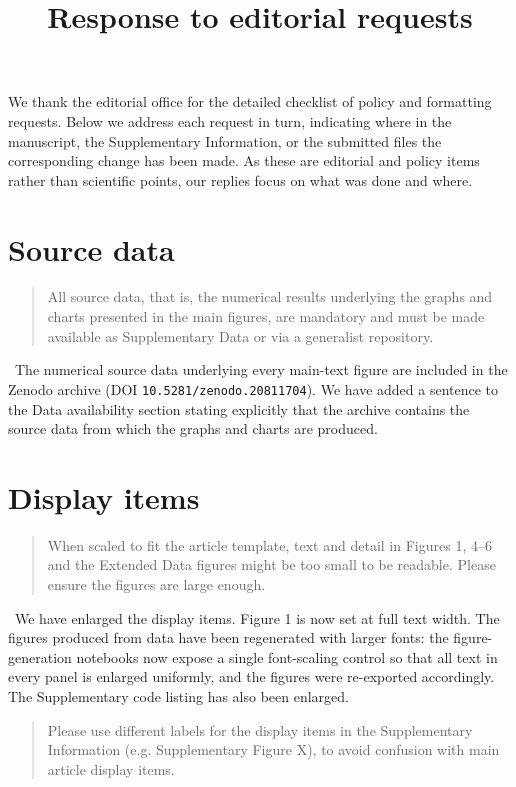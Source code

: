\documentclass[11pt]{article}
\title{Response to editorial requests}
\author{}
\date{}
\newcommand{\reply}{\vspace{0.25em}{\color{ForestGreen}\textbf{Reply:}}\ }
\newenvironment{editorcomment}
{\vspace{0.5em}\begin{quote}\color{NavyBlue}}
{\end{quote}}
\begin{document}
\maketitle

We thank the editorial office for the detailed checklist of policy and formatting
requests. Below we address each request in turn, indicating where in the
manuscript, the Supplementary Information, or the submitted files the
corresponding change has been made. As these are editorial and policy items
rather than scientific points, our replies focus on what was done and where.

\section*{Source data}

\begin{editorcomment}
All source data, that is, the numerical results underlying the graphs and charts
presented in the main figures, are mandatory and must be made available as
Supplementary Data or via a generalist repository.
\end{editorcomment}

\reply The numerical source data underlying every main-text figure are included
in the Zenodo archive (DOI \texttt{10.5281/zenodo.20811704}). We have added a
sentence to the Data availability section stating explicitly that the archive
contains the source data from which the graphs and charts are produced.

\section*{Display items}

\begin{editorcomment}
When scaled to fit the article template, text and detail in Figures 1, 4--6 and
the Extended Data figures might be too small to be readable. Please ensure the
figures are large enough.
\end{editorcomment}

\reply We have enlarged the display items. Figure 1 is now set at full text
width. The figures produced from data have been regenerated with larger fonts:
the figure-generation notebooks now expose a single font-scaling control so that
all text in every panel is enlarged uniformly, and the figures were re-exported
accordingly. The Supplementary code listing has also been enlarged.

\begin{editorcomment}
Please use different labels for the display items in the Supplementary
Information (e.g. Supplementary Figure X), to avoid confusion with main article
display items.
\end{editorcomment}
\end{document}

